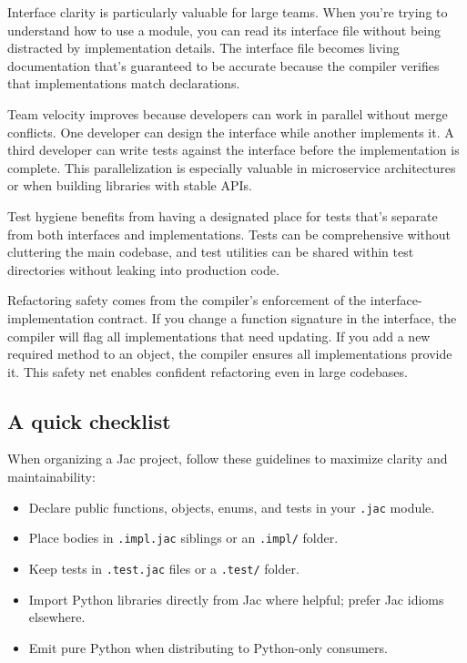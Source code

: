 Interface clarity is particularly valuable for large teams. When you're trying to understand how to use a module, you can read its interface file without being distracted by implementation details. The interface file becomes living documentation that's guaranteed to be accurate because the compiler verifies that implementations match declarations.

Team velocity improves because developers can work in parallel without merge conflicts. One developer can design the interface while another implements it. A third developer can write tests against the interface before the implementation is complete. This parallelization is especially valuable in microservice architectures or when building libraries with stable APIs.

Test hygiene benefits from having a designated place for tests that's separate from both interfaces and implementations. Tests can be comprehensive without cluttering the main codebase, and test utilities can be shared within test directories without leaking into production code.

Refactoring safety comes from the compiler's enforcement of the interface-implementation contract. If you change a function signature in the interface, the compiler will flag all implementations that need updating. If you add a new required method to an object, the compiler ensures all implementations provide it. This safety net enables confident refactoring even in large codebases.

\subsection*{A quick checklist}

When organizing a Jac project, follow these guidelines to maximize clarity and maintainability:

\begin{itemize}
    \item Declare public functions, objects, enums, and tests in your \texttt{.jac} module.
    \item Place bodies in \texttt{.impl.jac} siblings or an \texttt{.impl/} folder.
    \item Keep tests in \texttt{.test.jac} files or a \texttt{.test/} folder.
    \item Import Python libraries directly from Jac where helpful; prefer Jac idioms elsewhere.
    \item Emit pure Python when distributing to Python-only consumers.
\end{itemize}

